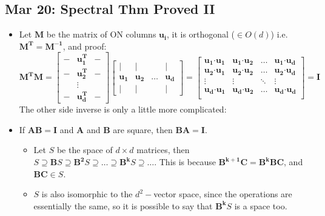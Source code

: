 \documentclass[10pt, oneside]{article}
\newcommand{\Cdot}{\boldsymbol{\cdot}}
\renewcommand{\vec}[1]{\mathbf{#1}}
\newcommand{\mat}[1]{\mathbf{#1}}
\begin{document}
\subsection{Mar 20: Spectral Thm Proved II}
\begin{itemize}
    \item Let $\mat{M}$ be the matrix of ON columns $\vec{u_i}$, it is orthogonal ($\in O(d)$) i.e. $\mat{M^T} = \mat{M^{-1}}$, and proof:
            \[\mat{M^T}\mat{M} = 
            \begin{bmatrix}
                - & \vec{u_1^T} & -\\
                - & \vec{u_2^T} & -\\
                 & \vdots &\\
                - & \vec{u_d^T} & -
            \end{bmatrix}
            \begin{bmatrix}
                | & | &  & |\\
                \vec{u_1} & \vec{u_2} & \hdots & \vec{u_d}\\
                | & | &  & |
                \end{bmatrix} =
            \begin{bmatrix}
                \vec{u_1} \Cdot \vec{u_1} &  \vec{u_1} \Cdot \vec{u_2} & \hdots &  \vec{u_1} \Cdot \vec{u_d}\\
                \vec{u_2} \Cdot \vec{u_1} &  \vec{u_2} \Cdot \vec{u_2} & \hdots &  \vec{u_2} \Cdot \vec{u_d}\\ 
                \vdots & \vdots & \ddots & \vdots\\
                \vec{u_d} \Cdot \vec{u_1} &  \vec{u_d} \Cdot \vec{u_2} & \hdots &  \vec{u_d} \Cdot \vec{u_d}\\
            \end{bmatrix} = \mat{I}\]
            The other side inverse is only a little more complicated:
    \item If $\mat{A}\mat{B} = \mat{I}$ and $\mat{A}$ and $\mat{B}$ are square, then $\mat{B}\mat{A} = \mat{I}$.
        \begin{itemize}
            \item Let $S$ be the space of $d \times d$ matrices, then $S \supseteq \mat{B}S \supseteq \mat{B^2}S \supseteq \hdots \supseteq \mat{B^k}S \supseteq \hdots$. This is because $\mat{B^{k+1}} \mat{C} = \mat{B^k} \mat{BC}$, and $\mat{BC} \in S$. 
            \item $S$ is also isomorphic to the $d^2-$vector space, since the operations are essentially the same, so it is possible to say that $\mat{B^k}S$ is a space too. 

\end{itemize}
\end{itemize}
\end{document}
